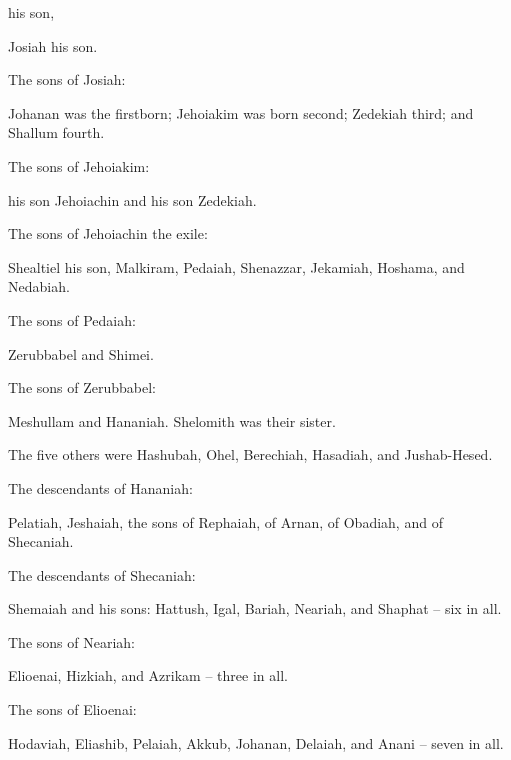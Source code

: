 {his son,
\par }{\PP Josiah
his son.
\par }{\PP {}The sons
of Josiah:
\par }{\PP Johanan
was the firstborn;
Jehoiakim
was born second;
Zedekiah
third;
and Shallum
fourth.
\par }{\PP {}The sons
of Jehoiakim:
\par }{\PP his son
Jehoiachin
and his son
Zedekiah.
\par }{\PP {}The sons
of Jehoiachin
the exile:
\par }{\PP Shealtiel
his son,
Malkiram,
Pedaiah,
Shenazzar,
Jekamiah,
Hoshama,
and Nedabiah.
\par }{\PP {}The sons
of Pedaiah:
\par }{\PP Zerubbabel
and Shimei.
\par }{\PP The sons
of Zerubbabel:
\par }{\PP Meshullam
and Hananiah.
Shelomith
was their sister.
\par }{\PP {}The five
others were Hashubah,
Ohel,
Berechiah,
Hasadiah,
and Jushab-Hesed.
\par }{\PP {}The descendants
of Hananiah:
\par }{\PP Pelatiah,
Jeshaiah,
the sons
of Rephaiah,
of Arnan,
of Obadiah,
and of Shecaniah.
\par }{\PP {}The descendants
of Shecaniah:
\par }{\PP Shemaiah
and his sons: Hattush,
Igal,
Bariah,
Neariah,
and Shaphat
– six in all.
\par }{\PP {}The sons
of Neariah:
\par }{\PP Elioenai,
Hizkiah,
and Azrikam
– three in all.
\par }{\PP {}The sons
of Elioenai:
\par }{\PP Hodaviah,
Eliashib,
Pelaiah,
Akkub,
Johanan,
Delaiah,
and Anani
– seven in all.

}
